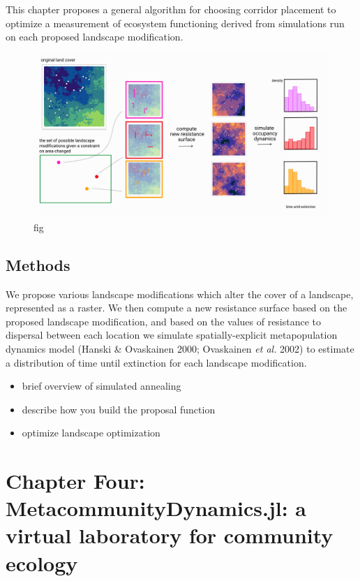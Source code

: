 \documentclass[10pt,oneside]{article}
\makeatletter
\def\maxwidth{\ifdim\Gin@nat@width>\linewidth\linewidth
\else\Gin@nat@width\fi}
\let\Oldincludegraphics\includegraphics
\renewcommand{\includegraphics}[1]{\Oldincludegraphics[width=\maxwidth]{#1}}
\makeatother
\begin{document}
This chapter proposes a general algorithm for choosing corridor
placement to optimize a measurement of ecosystem functioning derived
from simulations run on each proposed landscape modification.

\begin{figure}
\hypertarget{fig:ch3}{%
\centering
\includegraphics{./figures/ch3.png}
\caption{fig}\label{fig:ch3}
}
\end{figure}

\hypertarget{methods-1}{%
\subsection{Methods}\label{methods-1}}

We propose various landscape modifications which alter the cover of a
landscape, represented as a raster. We then compute a new resistance
surface based on the proposed landscape modification, and based on the
values of resistance to dispersal between each location we simulate
spatially-explicit metapopulation dynamics model (Hanski \& Ovaskainen
2000; Ovaskainen \emph{et al.} 2002) to estimate a distribution of time
until extinction for each landscape modification.

\begin{itemize}
\tightlist
\item
  brief overview of simulated annealing
\item
  describe how you build the proposal function
\item
  optimize landscape optimization
\end{itemize}

\hypertarget{chapter-four-metacommunitydynamics.jl-a-virtual-laboratory-for-community-ecology}{%
\section{Chapter Four: MetacommunityDynamics.jl: a virtual laboratory
for community
ecology}\label{chapter-four-metacommunitydynamics.jl-a-virtual-laboratory-for-community-ecology}}
\end{document}
